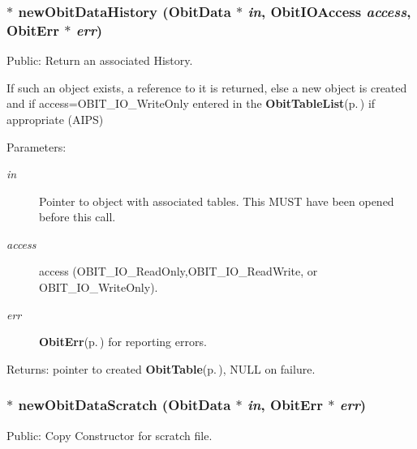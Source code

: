 \subsubsection{$\ast$ new\-Obit\-Data\-History ({\bf Obit\-Data} $\ast$ {\em in}, Obit\-IOAccess {\em access}, {\bf Obit\-Err} $\ast$ {\em err})}\label{ObitData_8c_a21}


Public: Return an associated History. 

If such an object exists, a reference to it is returned, else a new object is created and if access=OBIT\_\-IO\_\-Write\-Only entered in the {\bf Obit\-Table\-List}{\rm (p.\,\pageref{structObitTableList})} if appropriate (AIPS) \begin{Desc}
\item[Parameters:]
\begin{description}
\item[{\em in}]Pointer to object with associated tables. This MUST have been opened before this call. \item[{\em access}]access (OBIT\_\-IO\_\-Read\-Only,OBIT\_\-IO\_\-Read\-Write, or OBIT\_\-IO\_\-Write\-Only). \item[{\em err}]{\bf Obit\-Err}{\rm (p.\,\pageref{structObitErr})} for reporting errors. \end{description}
\end{Desc}
\begin{Desc}
\item[Returns:]pointer to created {\bf Obit\-Table}{\rm (p.\,\pageref{structObitTable})}, NULL on failure. \end{Desc}
\subsubsection{$\ast$ new\-Obit\-Data\-Scratch ({\bf Obit\-Data} $\ast$ {\em in}, {\bf Obit\-Err} $\ast$ {\em err})}\label{ObitData_8c_a9}


Public: Copy Constructor for scratch file. 

